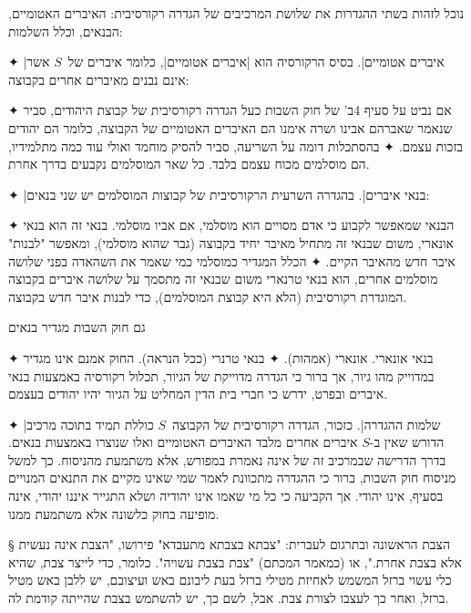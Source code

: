 נוכל לזהות בשתי ההגדרות את שלושת המרכיבים של הגדרה רקורסיבית: האיברים
האטומיים, הבנאים, וכלל השלמות:
\begin{itemize}
  ✦ \ע|איברים אטומיים|. בסיס הרקורסיה הוא \ע|איברים אטומיים|, כלומר איברים
  של~$S$ אשר אינם נבנים מאיברים אחרים בקבוצה:
  \begin{enumerate}
  ✦ אם נביט על סעיף 4ב' של חוק השבות כעל הגדרה רקורסיבית של קבוצת היהודים, סביר
  שנאמר שאברהם אבינו ושרה אימנו הם האיברים האטומיים של הקבוצה, כלומר הם יהודים
  בזכות עצמם.
  ✦ בהסתכלות דומה על השריעה, סביר להסיק מוחמד ואולי עוד כמה מתלמידיו, הם
  מוסלמים מכוח עצמם בלבד. כל שאר המוסלמים נקבעים בדרך אחרת.
  \end{enumerate}
  ✦ \ע|בנאי איברים|. בהגדרה השרעית הרקורסיבית של קבוצות
  המוסלמים יש שני בנאים:
  \begin{enumerate}
  ✦ הבנאי שמאפשר לקבוע כי אדם מסויים הוא מוסלמי, אם אביו מוסלמי. בנאי זה הוא בנאי
  אונארי, משום שבנאי זה מתחיל מאיבר יחיד בקבוצה (גבר שהוא מוסלמי), ומאפשר
  "לבנות" איבר חדש מהאיבר הקיים.
  ✦ הכלל המגדיר כמוסלמי כמי שאמר את השהאדה בפני שלושה מוסלמים אחרים, הוא בנאי
  טרנארי משום שבנאי זה מתסמך על שלושה איברים בקבוצה המוגדרת רקורסיבית (הלא היא
  קבוצת המוסלמים), כדי לבנות איבר חדש בקבוצה.
  \end{enumerate}
  גם חוק השבות מגדיר בנאים
  \begin{enumerate}
  ✦ בנאי אונארי.
  אונארי (אמהות).
  ✦ בנאי טרנרי (ככל הנראה). החוק אמנם אינו מגדיר
  במדוייק מהו גיור, אך ברור כי הגדרה מדוייקת של הגיור, תכלול רקורסיה באמצעות בנאי
  איברים ובפרט, ידרש כי חברי בית הדין המחליט על הגיור יהיו יהודים בעצמם.
  \end{enumerate}

 ✦ \ע|שלמות ההגדרה|. כזכור, הגדרה רקורסיבית של הקבוצה~$S$ כוללת תמיד בתוכה מרכיב
  הדורש שאין ב-$S$ איברים אחרים מלבד האיברים האטומיים ואלו שנוצרו באמצעות
  בנאים. בדרך הדרישה שבמרכיב זה של אינה נאמרת במפורש, אלא משתמעת מהניסוח. כך
  למשל מניסוח חוק השבות, ברור כי ההגדרה מתכוונת לאמר שמי שאינו מקיים את התנאים
  המנויים בסעיף, אינו יהודי. אך הקביעה כי כל מי שאמו אינו יהודיה ושלא התגייר
  איננו יהודי, אינה מופיעה בחוק כלשונה אלא משתמעת ממנו.
\end{itemize}

§ הצבת הראשונה
ובתרגום לעברית: "צבתא בצבתא מתעבדא" פירושו, "הצבת אינה נעשית אלא בצבת אחרת.",
או (כמאמר המכתם) "צבת בצבת עשויה". כלומר, כדי לייצר צבת, שהיא כלי עשוי ברזל
המשמש לאחיזת מטילי ברזל בעת ליבונם באש ועיצובם, יש ללבן באש מטיל ברזל, ואחר כך
לעצבו לצורת צבת. אבל, לשם כך, יש להשתמש בצבת שהייתה קודמת לה.


